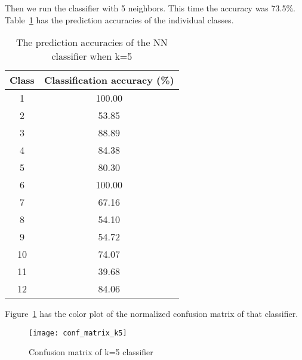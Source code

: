 Then we run the classifier with 5 neighbors. This time the accuracy was 73.5\%.
Table~\ref{tab:accuracy_k5} has the prediction accuracies of the individual
classes.
\begin{table}
  \centering
  \caption{The prediction accuracies of the NN classifier when k=5}
  \begin{tabular}{cc}  
    \toprule
    \cmidrule(r){1-2}
    Class    & Classification accuracy (\%) \\
    \midrule

    1	& 100.00  \\
    2	& 53.85  \\
    3	& 88.89  \\
    4	& 84.38  \\
    5	& 80.30  \\
    6	& 100.00  \\
    7	& 67.16  \\
    8	& 54.10  \\
    9	& 54.72  \\
    10	& 74.07  \\
    11	& 39.68  \\
    12	& 84.06  \\

    \bottomrule
  \end{tabular}
\label{tab:accuracy_k5}
\end{table}

Figure~\ref{fig:conf_mat_k5} has the color plot of the normalized confusion
matrix of that classifier.
\begin{figure}[h]
  \centering
  \texttt{[image: conf\_matrix\_k5]}
  \caption{Confusion matrix of k=5 classifier}
\label{fig:conf_mat_k5}
\end{figure}









